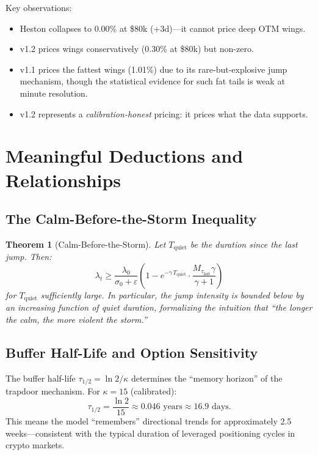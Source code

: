\documentclass[11pt,a4paper]{article}
\newtheorem{theorem}{Theorem}[section]
\begin{document}
Key observations:
\begin{itemize}[nosep]
  \item Heston collapses to 0.00\% at \$80k (+3d)---it cannot price deep OTM wings.
  \item v1.2 prices wings conservatively (0.30\% at \$80k) but non-zero.
  \item v1.1 prices the fattest wings (1.01\%) due to its rare-but-explosive jump mechanism,
    though the statistical evidence for such fat tails is weak at minute resolution.
  \item v1.2 represents a \emph{calibration-honest} pricing: it prices what the data supports.
\end{itemize}

\section{Meaningful Deductions and Relationships}
\label{sec:deductions}

\subsection{The Calm-Before-the-Storm Inequality}

\begin{theorem}[Calm-Before-the-Storm]
\label{thm:calm}
Let $T_{\text{quiet}}$ be the duration since the last jump. Then:
\[
  \lambda_t \geq \frac{\lambda_0}{\sigma_0 + \varepsilon}
  \left(1 - e^{-\gamma\, T_{\text{quiet}}} \cdot \frac{M_{\tau_{\text{last}}} \gamma}{\gamma + 1}\right)
\]
for $T_{\text{quiet}}$ sufficiently large. In particular, the jump
intensity is bounded below by an increasing function of quiet duration,
formalizing the intuition that ``the longer the calm, the more violent
the storm.''
\end{theorem}

\subsection{Buffer Half-Life and Option Sensitivity}

The buffer half-life $\tau_{1/2} = \ln 2 / \kappa$ determines the
``memory horizon'' of the trapdoor mechanism. For $\kappa = 15$ (calibrated):
\[
  \tau_{1/2} = \frac{\ln 2}{15} \approx 0.046 \text{ years} \approx 16.9 \text{ days}.
\]
This means the model ``remembers'' directional trends for approximately
2.5 weeks---consistent with the typical duration of leveraged positioning
cycles in crypto markets.
\end{document}
